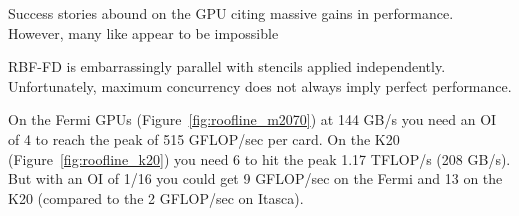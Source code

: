 \documentclass{report}
\begin{document}
Success stories abound on the GPU citing massive gains in performance. However, many like \cite{Phillips2009} appear to be impossible

RBF-FD is embarrassingly parallel with stencils applied independently. Unfortunately, maximum concurrency does not always imply perfect performance. 

On the Fermi GPUs (Figure~\ref{fig:roofline_m2070}) at 144 GB/s you need an OI of 4 to reach the peak of 515 GFLOP/sec per card. On the K20 (Figure~\ref{fig:roofline_k20}) you need 6 to hit the peak 1.17 TFLOP/s (208 GB/s). But with an OI of 1/16 you could get 9 GFLOP/sec on the Fermi and 13 on the K20 (compared to the 2 GFLOP/sec on Itasca). 

%
%
\end{document}
